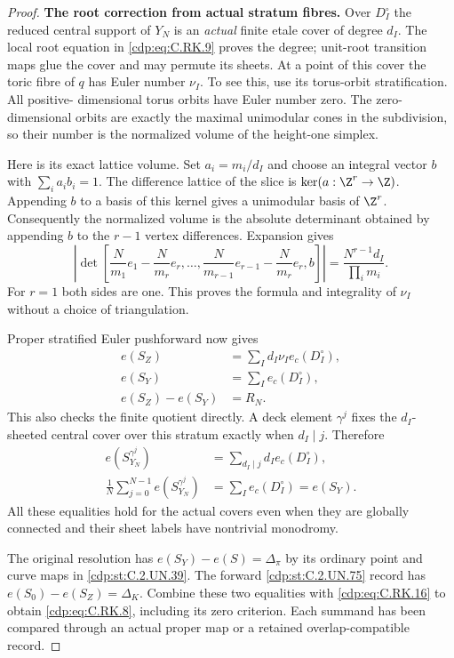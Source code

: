 \begin{proof}
\par\medskip\noindent\textbf{The root correction from actual stratum fibres.}
Over $D_I^\circ$ the reduced
central support of $Y_N$ is an
\emph{actual} finite etale cover
of degree $d_I$. The local root
equation in \eqref{cdp:eq:C.RK.9} proves the
degree; unit-root transition
maps glue the cover and may
permute its sheets. At a point
of this cover the toric fibre
of $q$ has Euler number $\nu_I$.
To see this, use its torus-orbit
stratification. All positive-
dimensional torus orbits have
Euler number zero. The zero-
dimensional orbits are exactly
the maximal unimodular cones
in the subdivision, so their
number is the normalized
volume of the height-one
simplex.

Here is its exact lattice
volume. Set $a_i=m_i/d_I$ and
choose an integral vector $b$
with $\sum_i a_i b_i=1$.
The difference lattice of
the slice is
$\ker(a:\Z^r\to\Z)$.
Appending $b$ to a basis of
this kernel gives a unimodular
basis of $\Z^r$. Consequently
the normalized volume is the
absolute determinant obtained
by appending $b$ to the $r-1$
vertex differences. Expansion
gives
\[
 \left|\det\left[
 \frac{N}{m_1}e_1-\frac{N}{m_r}e_r,
 \ldots,
 \frac{N}{m_{r-1}}e_{r-1}-\frac{N}{m_r}e_r,
 b\right]\right|
               =\frac{N^{r-1}d_I}{\prod_i m_i}.
\tag{C.RK.15}\label{cdp:eq:C.RK.15}
\]
For $r=1$ both sides are one.
This proves the formula and
integrality of $\nu_I$ without
a choice of triangulation.

Proper stratified Euler
pushforward now gives
\[
 \begin{split}
 e(S_Z)&=\sum_I d_I\nu_I e_c(D_I^\circ),\\
 e(S_Y)&=\sum_I e_c(D_I^\circ),\\
 e(S_Z)-e(S_Y)&=R_N.
 \end{split}
\tag{C.RK.16}\label{cdp:eq:C.RK.16}
\]
This also checks the finite
quotient directly. A deck
element $\gamma^j$ fixes the
$d_I$-sheeted central cover
over this stratum exactly
when $d_I\mid j$. Therefore
\[
 \begin{split}
 e(S_{Y_N}^{\gamma^j})
       &=\sum_{d_I\mid j}d_I e_c(D_I^\circ),\\
 \frac1N\sum_{j=0}^{N-1}
          e(S_{Y_N}^{\gamma^j})
       &=\sum_I e_c(D_I^\circ)=e(S_Y).
 \end{split}
\tag{C.RK.17}\label{cdp:eq:C.RK.17}
\]
All these equalities hold for
the actual covers even when
they are globally connected
and their sheet labels have
nontrivial monodromy.

The original resolution has
$e(S_Y)-e(S)=\Delta_\pi$ by
its ordinary point and curve
maps in \ref{cdp:st:C.2.UN.39}. The forward
\ref{cdp:st:C.2.UN.75} record has
$e(S_0)-e(S_Z)=\Delta_K$.
Combine these two equalities
with \eqref{cdp:eq:C.RK.16} to obtain
\eqref{cdp:eq:C.RK.8}, including its zero
criterion. Each summand has
been compared through an
actual proper map or a
retained overlap-compatible
record.


\end{proof}

